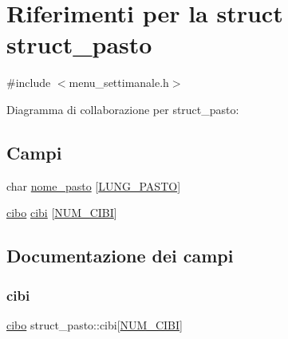 \hypertarget{structstruct__pasto}{}\section{Riferimenti per la struct struct\+\_\+pasto}
\label{structstruct__pasto}


{\ttfamily \#include $<$menu\+\_\+settimanale.\+h$>$}



Diagramma di collaborazione per struct\+\_\+pasto\+:
\subsection*{Campi}
\begin{DoxyCompactItemize}
\item 
char \hyperlink{structstruct__pasto_a49b887c2a9095d690e16e30dfc661b55}{nome\+\_\+pasto} \mbox{[}\hyperlink{menu__settimanale_8h_ab1b0c8053eda8a811aae87dd756b1530}{L\+U\+N\+G\+\_\+\+P\+A\+S\+TO}\mbox{]}
\item 
\hyperlink{menu__settimanale_8h_ad59bf52977c02589a75aeab3b2358b68}{cibo} \hyperlink{structstruct__pasto_abf8ef83f2316dd5323f00c55081f45e6}{cibi} \mbox{[}\hyperlink{menu__settimanale_8h_a70afbf8b7e7e8486fdec619990ec6073}{N\+U\+M\+\_\+\+C\+I\+BI}\mbox{]}
\end{DoxyCompactItemize}


\subsection{Documentazione dei campi}
\mbox{\label{structstruct__pasto_abf8ef83f2316dd5323f00c55081f45e6}} 
\subsubsection{\texorpdfstring{cibi}{cibi}}
{\footnotesize\ttfamily \hyperlink{menu__settimanale_8h_ad59bf52977c02589a75aeab3b2358b68}{cibo} struct\+\_\+pasto\+::cibi\mbox{[}\hyperlink{menu__settimanale_8h_a70afbf8b7e7e8486fdec619990ec6073}{N\+U\+M\+\_\+\+C\+I\+BI}\mbox{]}}

\mbox{\label{structstruct__pasto_a49b887c2a9095d690e16e30dfc661b55}} 
